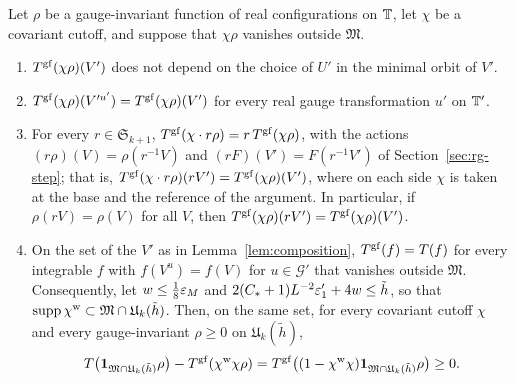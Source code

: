 \begin{lemma}\label{lem:gf-step-invariance}
Let $\rho$ be a gauge-invariant function of real configurations on $\mathbb T$, let $\chi$ be a covariant cutoff, and suppose that $\chi\rho$ vanishes outside $\mathfrak M$.
\begin{enumerate}[label=(\roman*)]
\item $T^{\rm gf}(\chi\rho)(V')$ does not depend on the choice of $U'$ in the minimal orbit of $V'$.
\item $T^{\rm gf}(\chi\rho)(V'^{u'})=T^{\rm gf}(\chi\rho)(V')$ for every real gauge transformation $u'$ on $\mathbb T'$.
\item For every $r\in\mathfrak S_{k+1}$, $T^{\rm gf}(\chi\cdot r\rho)=r\,T^{\rm gf}(\chi\rho)$, with the actions $(r\rho)(V)=\rho(r^{-1}V)$ and $(rF)(V')=F(r^{-1}V')$ of Section~\ref{sec:rg-step}; that is, $T^{\rm gf}(\chi\cdot r\rho)(rV')=T^{\rm gf}(\chi\rho)(V')$, where on each side $\chi$ is taken at the base and the reference of the argument. In particular, if $\rho(rV)=\rho(V)$ for all $V$, then $T^{\rm gf}(\chi\rho)(rV')=T^{\rm gf}(\chi\rho)(V')$.
\item On the set of the $V'$ as in Lemma~\ref{lem:composition}, $T^{\rm gf}(f)=T(f)$ for every integrable $f$ with $f(V^u)=f(V)$ for $u\in\mathcal G'$ that vanishes outside $\mathfrak M$. Consequently, let $w\le\frac18\varepsilon_M$ and $2(C_*+1)L^{-2}\varepsilon'_1+4w\le\tilde h$, so that $\operatorname{supp}\chi^{\rm w}\subset\mathfrak M\cap\mathfrak U_k(\tilde h)$. Then, on the same set, for every covariant cutoff $\chi$ and every gauge-invariant $\rho\ge0$ on $\mathfrak U_k(\tilde h)$,
\[
T\big(\mathbf 1_{\mathfrak M\cap\mathfrak U_k(\tilde h)}\rho\big)-T^{\rm gf}(\chi^{\rm w}\chi\rho)=T^{\rm gf}\big((1-\chi^{\rm w}\chi)\mathbf 1_{\mathfrak M\cap\mathfrak U_k(\tilde h)}\rho\big)\ge0 .
\]
\end{enumerate}
\end{lemma}

